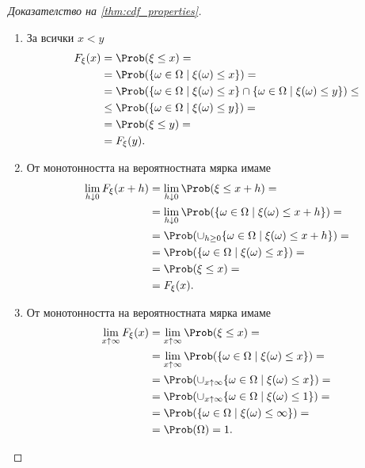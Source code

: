 \documentclass[
  headings=standardclasses,
  bibliography=totocnumbered,
]{scrartcl}
\begin{document}
\begin{proof}[Доказателство на \cref{thm:cdf_properties}]
  \Sufficiency
  \begin{enumerate}
    \item За всички \( x < y \)
    \begin{align*}
      F_\xi(x)
      &=
      \Prob(\xi \leq x)
      = \\ &=
      \Prob(\{ \omega \in \Omega \mid \xi(\omega) \leq x \})
      = \\ &=
      \Prob(\{ \omega \in \Omega \mid \xi(\omega) \leq x \} \cap \{ \omega \in \Omega \mid \xi(\omega) \leq y \})
      \leq \\ &\leq
      \Prob(\{ \omega \in \Omega \mid \xi(\omega) \leq y \})
      = \\ &=
      \Prob(\xi \leq y)
      = \\ &=
      F_\xi(y).
    \end{align*}

    \item От монотонността на вероятностната мярка имаме
    \begin{align*}
      \lim_{h \downarrow 0} F_\xi(x + h)
      &=
      \lim_{h \downarrow 0} \Prob(\xi \leq x + h)
      = \\ &=
      \lim_{h \downarrow 0} \Prob(\{ \omega \in \Omega \mid \xi(\omega) \leq x + h \})
      = \\ &=
      \Prob(\cup_{h \geq 0} \{ \omega \in \Omega \mid \xi(\omega) \leq x + h \})
      = \\ &=
      \Prob(\{ \omega \in \Omega \mid \xi(\omega) \leq x \})
      = \\ &=
      \Prob(\xi \leq x)
      = \\ &=
      F_\xi(x).
    \end{align*}

    \item От монотонността на вероятностната мярка имаме
    \begin{align*}
      \lim_{x \uparrow \infty} F_\xi(x)
      &=
      \lim_{x \uparrow \infty} \Prob(\xi \leq x)
      = \\ &=
      \lim_{x \uparrow \infty} \Prob(\{ \omega \in \Omega \mid \xi(\omega) \leq x \})
      = \\ &=
      \Prob(\cup_{x \uparrow \infty} \{ \omega \in \Omega \mid \xi(\omega) \leq x \})
      = \\ &=
      \Prob(\cup_{x \uparrow \infty} \{ \omega \in \Omega \mid \xi(\omega) \leq 1 \})
      = \\ &=
      \Prob(\{ \omega \in \Omega \mid \xi(\omega) \leq \infty \})
      = \\ &=
      \Prob(\Omega)
      =
      1.
    \end{align*}


\end{enumerate}
\end{proof}
\end{document}
